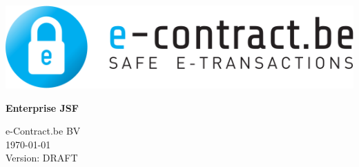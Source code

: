 \documentclass[12pt, a4paper]{report}
\begin{document}
\begin{titlepage}
\begin{center}
\includegraphics[scale=0.8]{e-contract-logoFINAL}
\end{center}
\vspace{8cm}
\begin{center}
{\fontsize{50}{60}\selectfont\textbf{Enterprise JSF}}
\end{center}
\vspace{8cm}
\begin{flushright}
e-Contract.be BV\\
\today \\
Version: DRAFT
\end{flushright}
\end{titlepage}

\setcounter{tocdepth}{3}
\setcounter{secnumdepth}{3}
\tableofcontents
























\listoffigures
\end{document}
